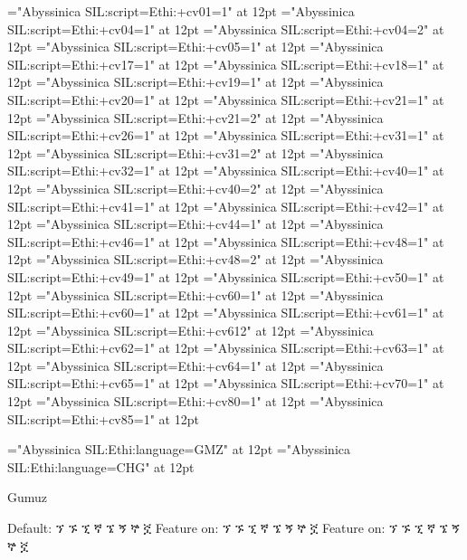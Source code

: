 \font\OTone="Abyssinica SIL:script=Ethi:+cv01=1" at 12pt
\font\OTfourone="Abyssinica SIL:script=Ethi:+cv04=1" at 12pt
\font\OTfourtwo="Abyssinica SIL:script=Ethi:+cv04=2" at 12pt 
\font\OTfive="Abyssinica SIL:script=Ethi:+cv05=1" at 12pt
\font\OTseventeen="Abyssinica SIL:script=Ethi:+cv17=1" at 12pt 
\font\OTeighteen="Abyssinica SIL:script=Ethi:+cv18=1" at 12pt 
\font\OTnineteen="Abyssinica SIL:script=Ethi:+cv19=1" at 12pt
\font\OTtwenty="Abyssinica SIL:script=Ethi:+cv20=1" at 12pt 
\font\OTtwentyoneone="Abyssinica SIL:script=Ethi:+cv21=1" at 12pt
\font\OTtwentyonetwo="Abyssinica SIL:script=Ethi:+cv21=2" at 12pt 
\font\OTtwentysix="Abyssinica SIL:script=Ethi:+cv26=1" at 12pt
\font\OTthirtyoneone="Abyssinica SIL:script=Ethi:+cv31=1" at 12pt
\font\OTthirtyonetwo="Abyssinica SIL:script=Ethi:+cv31=2" at 12pt 
\font\OTthirtytwo="Abyssinica SIL:script=Ethi:+cv32=1" at 12pt
\font\OTfortyone="Abyssinica SIL:script=Ethi:+cv40=1" at 12pt
\font\OTfortytwo="Abyssinica SIL:script=Ethi:+cv40=2" at 12pt 
\font\OTfortyoneone="Abyssinica SIL:script=Ethi:+cv41=1" at 12pt
\font\OTfortytwoone="Abyssinica SIL:script=Ethi:+cv42=1" at 12pt
\font\OTfortyfive="Abyssinica SIL:script=Ethi:+cv44=1" at 12pt
\font\OTfortysix="Abyssinica SIL:script=Ethi:+cv46=1" at 12pt
\font\OTfortyeightone="Abyssinica SIL:script=Ethi:+cv48=1" at 12pt
\font\OTfortyeighttwo="Abyssinica SIL:script=Ethi:+cv48=2" at 12pt 
\font\OTfortynine="Abyssinica SIL:script=Ethi:+cv49=1" at 12pt
\font\OTfifty="Abyssinica SIL:script=Ethi:+cv50=1" at 12pt
\font\OTsixtyone="Abyssinica SIL:script=Ethi:+cv60=1" at 12pt
\font\OTsixtytwo="Abyssinica SIL:script=Ethi:+cv60=1" at 12pt 
\font\OTsixtyoneone="Abyssinica SIL:script=Ethi:+cv61=1" at 12pt
\font\OTsixtyonetwo="Abyssinica SIL:script=Ethi:+cv61{2}" at 12pt 
\font\OTsixtytwoone="Abyssinica SIL:script=Ethi:+cv62=1" at 12pt
\font\OTsixtythree="Abyssinica SIL:script=Ethi:+cv63=1" at 12pt
\font\OTsixtyfour="Abyssinica SIL:script=Ethi:+cv64=1" at 12pt
\font\OTsixtyfive="Abyssinica SIL:script=Ethi:+cv65=1" at 12pt 
\font\OTseventy="Abyssinica SIL:script=Ethi:+cv70=1" at 12pt
\font\OTeighty="Abyssinica SIL:script=Ethi:+cv80=1" at 12pt
\font\OTeightyfive="Abyssinica SIL:script=Ethi:+cv85=1" at 12pt

\font\GMZ="Abyssinica SIL:Ethi:language=GMZ" at 12pt
\font\CHG="Abyssinica SIL:Ethi:language=CHG" at 12pt

\A Gumuz

\IndSS Default: ኘ ኙ ኚ ኛ ኜ ኝ ኞ ኟ
\IndSS\guk Feature on: ኘ ኙ ኚ ኛ ኜ ኝ ኞ ኟ
\IndSS\GMZ Feature on: ኘ ኙ ኚ ኛ ኜ ኝ ኞ ኟ


